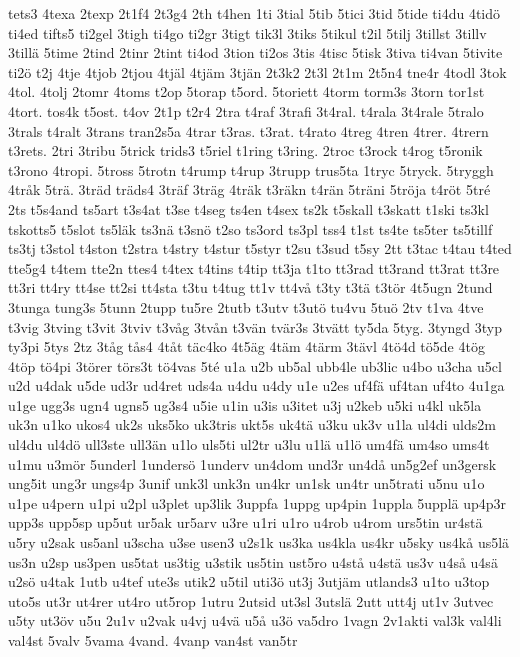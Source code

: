 {tets3
4texa
2texp
2t1f4
2t3g4
2th
t4hen
1ti
3tial
5tib
5tici
3tid
5tide
ti4du
4tidö
ti4ed
tifts5
ti2gel
3tigh
ti4go
ti2gr
3tigt
tik3l
3tiks
5tikul
t2il
5tilj
3tillst
3tillv
3tillä
5time
2tind
2tinr
2tint
ti4od
3tion
ti2os
3tis
4tisc
5tisk
3tiva
ti4van
5tivite
ti2ö
t2j
4tje
4tjob
2tjou
4tjäl
4tjäm
3tjän
2t3k2
2t3l
2t1m
2t5n4
tne4r
4todl
3tok
4tol.
4tolj
2tomr
4toms
t2op
5torap
t5ord.
5toriett
4torm
torm3s
3torn
tor1st
4tort.
tos4k
t5ost.
t4ov
2t1p
t2r4
2tra
t4raf
3trafi
3t4ral.
t4rala
3t4rale
5tralo
3trals
t4ralt
3trans
tran2s5a
4trar
t3ras.
t3rat.
t4rato
4treg
4tren
4trer.
4trern
t3rets.
2tri
3tribu
5trick
trids3
t5riel
t1ring
t3ring.
2troc
t3rock
t4rog
t5ronik
t3rono
4tropi.
5tross
5trotn
t4rump
t4rup
3trupp
trus5ta
1tryc
5tryck.
5tryggh
4tråk
5trä.
3träd
träds4
3träf
3träg
4träk
t3räkn
t4rän
5träni
5tröja
t4röt
5tré
2ts
t5s4and
ts5art
t3s4at
t3se
t4seg
ts4en
t4sex
ts2k
t5skall
t3skatt
t1ski
ts3kl
tskotts5
t5slot
ts5läk
ts3nä
t3snö
t2so
ts3ord
ts3pl
tss4
t1st
ts4te
ts5ter
ts5tillf
ts3tj
t3stol
t4ston
t2stra
t4stry
t4stur
t5styr
t2su
t3sud
t5sy
2tt
t3tac
t4tau
t4ted
tte5g4
t4tem
tte2n
ttes4
t4tex
t4tins
t4tip
tt3ja
t1to
tt3rad
tt3rand
tt3rat
tt3re
tt3ri
tt4ry
tt4se
tt2si
tt4sta
t3tu
t4tug
tt1v
tt4vå
t3ty
t3tä
t3tör
4t5ugn
2tund
3tunga
tung3s
5tunn
2tupp
tu5re
2tutb
t3utv
t3utö
tu4vu
5tuö
2tv
t1va
4tve
t3vig
3tving
t3vit
3tviv
t3våg
3tvån
t3vän
tvär3s
3tvätt
ty5da
5tyg.
3tyngd
3typ
ty3pi
5tys
2tz
3tåg
tås4
4tåt
täc4ko
4t5äg
4täm
4tärm
3tävl
4tö4d
tö5de
4tög
4töp
tö4pi
3törer
törs3t
tö4vas
5té
u1a
u2b
ub5al
ubb4le
ub3lic
u4bo
u3cha
u5cl
u2d
u4dak
u5de
ud3r
ud4ret
uds4a
u4du
u4dy
u1e
u2es
uf4fä
uf4tan
uf4to
4u1ga
u1ge
ugg3s
ugn4
ugns5
ug3s4
u5ie
u1in
u3is
u3itet
u3j
u2keb
u5ki
u4kl
uk5la
uk3n
u1ko
ukos4
uk2s
uks5ko
uk3tris
ukt5s
uk4tä
u3ku
uk3v
u1la
ul4di
ulds2m
ul4du
ul4dö
ull3ste
ull3än
u1lo
uls5ti
ul2tr
u3lu
u1lä
u1lö
um4fä
um4so
ums4t
u1mu
u3mör
5underl
1undersö
1underv
un4dom
und3r
un4då
un5g2ef
un3gersk
ung5it
ung3r
ungs4p
3unif
unk3l
unk3n
un4kr
un1sk
un4tr
un5trati
u5nu
u1o
u1pe
u4pern
u1pi
u2pl
u3plet
up3lik
3uppfa
1uppg
up4pin
1uppla
5upplä
up4p3r
upp3s
upp5sp
up5ut
ur5ak
ur5arv
u3re
u1ri
u1ro
u4rob
u4rom
urs5tin
ur4stä
u5ry
u2sak
us5anl
u3scha
u3se
usen3
u2s1k
us3ka
us4kla
us4kr
u5sky
us4kå
us5lä
us3n
u2sp
us3pen
us5tat
us3tig
u3stik
us5tin
ust5ro
u4stå
u4stä
us3v
u4så
u4sä
u2sö
u4tak
1utb
u4tef
ute3s
utik2
u5til
uti3ö
ut3j
3utjäm
utlands3
u1to
u3top
uto5s
ut3r
ut4rer
ut4ro
ut5rop
1utru
2utsid
ut3sl
3utslä
2utt
utt4j
ut1v
3utvec
u5ty
ut3öv
u5u
2u1v
u2vak
u4vj
u4vä
u5å
u3ö
va5dro
1vagn
2v1akti
val3k
val4li
val4st
5valv
5vama
4vand.
4vanp
van4st
van5tr
}
